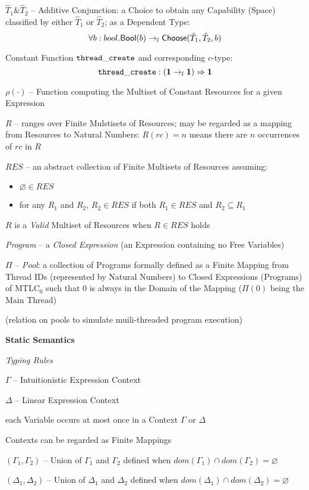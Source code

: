 $\hat{T}_1 \& \hat{T}_2$ -- Additive Conjunction: a Choice to obtain
any Capability (Space) classified by either $\hat{T}_1$ or
$\hat{T}_2$; as a Dependent Type:
\[
  \forall b : bool. \mathsf{Bool}(b)
    \rightarrow_l \mathsf{Choose}(\hat{T}_1, \hat{T}_2, b)
\]

Constant Function $\mathtt{thread\_create}$ and corresponding $c$-type:
\[
  \mathtt{thread\_create} : (\mathbf{1} \rightarrow_l \mathbf{1}) \Rightarrow \mathbf{1}
\]

$\rho(\cdot)$ -- Function computing the Multiset of Constant Resources
for a given Expression %

$R$ -- ranges over Finite Mulstisets of Resources; may be regarded as
a mapping from Resources to Natural Numbers: $R(rc) = n$ means there
are $n$ occurrences of $rc$ in $R$

$RES$ -- an abstract collection of Finite Multisets of Resources
assuming:
\begin{itemize}
  \item $\varnothing \in RES$
  \item for any $R_1$ and $R_2$, $R_2 \in RES$ if both $R_1 \in RES$
    and $R_2 \subseteq R_1$
\end{itemize}
$R$ is a \emph{Valid} Multiset of Resources when $R \in RES$ holds

\emph{Program} -- a \emph{Closed Expression} (an Expression containing
no Free Variables)

$\Pi$ -- \emph{Pool}: a collection of Programs formally defined as a
Finite Mapping from Thread IDs (represented by Natural Numbers) to
Closed Expressions (Programs) of MTLC$_0$ such that $0$ is always in
the Domain of the Mapping ($\Pi(0)$ being the Main Thread)

(relation on pools to simulate muili-threaded program execution) %


\textbf{Static Semantics}

\emph{Typing Rules}


$\Gamma$ -- Intuitionistic Expression Context

$\Delta$ -- Linear Expression Context

each Variable occurs at most once in a Context $\Gamma$ or $\Delta$

Contexts can be regarded as Finite Mappings

$(\Gamma_1, \Gamma_2)$ -- Union of $\Gamma_1$ and $\Gamma_2$ defined
when $dom(\Gamma_1) \cap dom(\Gamma_2) = \varnothing$

$(\Delta_1, \Delta_2)$ -- Union of $\Delta_1$ and $\Delta_2$ defined
when $dom(\Delta_1) \cap dom(\Delta_2) = \varnothing$

